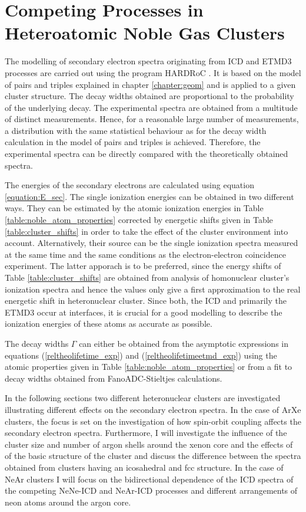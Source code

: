 \chapter[Heteroatomic Noble Gas Clusters]{Competing Processes in Heteroatomic Noble Gas Clusters}
\label{chapter_clusters}

The modelling of secondary electron spectra originating from \ac{ICD}
and \ac{ETMD}3 processes are carried out using the program
HARDRoC \cite{HARDRoC}. It is based on the model of pairs and
triples explained in chapter \ref{chapter:geom} and is applied
to a given cluster structure. The 
decay widths obtained are proportional to the probability of the underlying decay.
The experimental spectra are obtained from a multitude of distinct measurements.
Hence, for a reasonable large number of measurements, a distribution with the
same statistical behaviour as for the decay width calculation in the
model of pairs and triples is achieved. Therefore, the experimental spectra
can be directly compared with the theoretically obtained spectra.

The energies of the secondary electrons are calculated using
equation \ref{equation:E_sec}. The single ionization energies
can be obtained in two different ways. They can be
estimated by the atomic ionization energies in Table
\ref{table:noble_atom_properties} corrected by energetic shifts
given in Table \ref{table:cluster_shifts} in order to take
the effect of the cluster environment into account. 
Alternatively, their source can be the single ionization spectra measured
at the same time and the
same conditions as the electron-electron
coincidence experiment. The latter apporach is to be preferred,
since the energy shifts
of Table \ref{table:cluster_shifts} are obtained from analysis of
homonuclear cluster's ionization spectra and
hence the values only give a first approximation to the real energetic shift in
heteronuclear cluster. Since both, the \ac{ICD} and primarily the
\ac{ETMD}3 occur at interfaces, it is crucial for a good modelling to
describe the ionization energies of these atoms as accurate as possible.

The decay widths $\Gamma$ can either be obtained from the asymptotic expressions
in equations (\ref{reltheolifetime_exp}) and (\ref{reltheolifetimeetmd_exp})
using the atomic properties given in Table \ref{table:noble_atom_properties}
or from a fit to decay widths obtained from FanoADC-Stieltjes calculations.

In the following sections two different heteronuclear clusters are investigated
illustrating different effects on the secondary electron spectra.
In the case of ArXe clusters, the focus is set on the investigation of how
spin-orbit coupling affects
the secondary electron spectra. Furthermore, I will investigate the influence
of the cluster size and number of argon shells around the xenon core and
the effects of of the basic structure of the cluster and discuss the
difference between the spectra
obtained from clusters having an icosahedral
and \ac{fcc} structure.
In the case of NeAr clusters I will focus on the bidirectional dependence of
the ICD spectra of the competing NeNe-ICD and NeAr-ICD processes and
different arrangements of neon atoms around the argon core.

\newpage

\newpage


